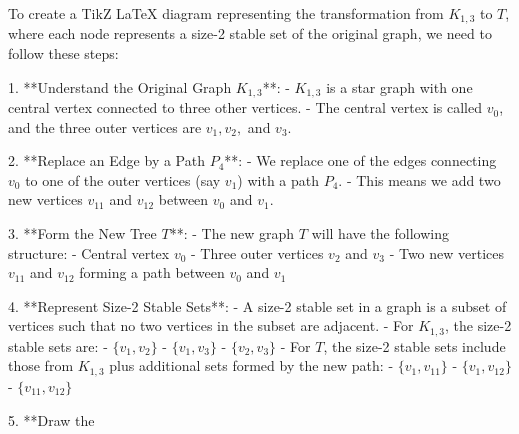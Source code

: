 To create a TikZ LaTeX diagram representing the transformation from \( K_{1,3} \) to \( T \), where each node represents a size-2 stable set of the original graph, we need to follow these steps:

1. **Understand the Original Graph \( K_{1,3} \)**:
   - \( K_{1,3} \) is a star graph with one central vertex connected to three other vertices.
   - The central vertex is called \( v_0 \), and the three outer vertices are \( v_1, v_2, \) and \( v_3 \).

2. **Replace an Edge by a Path \( P_4 \)**:
   - We replace one of the edges connecting \( v_0 \) to one of the outer vertices (say \( v_1 \)) with a path \( P_4 \).
   - This means we add two new vertices \( v_{11} \) and \( v_{12} \) between \( v_0 \) and \( v_1 \).

3. **Form the New Tree \( T \)**:
   - The new graph \( T \) will have the following structure:
     - Central vertex \( v_0 \)
     - Three outer vertices \( v_2 \) and \( v_3 \)
     - Two new vertices \( v_{11} \) and \( v_{12} \) forming a path between \( v_0 \) and \( v_1 \)

4. **Represent Size-2 Stable Sets**:
   - A size-2 stable set in a graph is a subset of vertices such that no two vertices in the subset are adjacent.
   - For \( K_{1,3} \), the size-2 stable sets are:
     - \( \{v_1, v_2\} \)
     - \( \{v_1, v_3\} \)
     - \( \{v_2, v_3\} \)
   - For \( T \), the size-2 stable sets include those from \( K_{1,3} \) plus additional sets formed by the new path:
     - \( \{v_1, v_{11}\} \)
     - \( \{v_1, v_{12}\} \)
     - \( \{v_{11}, v_{12}\} \)

5. **Draw the